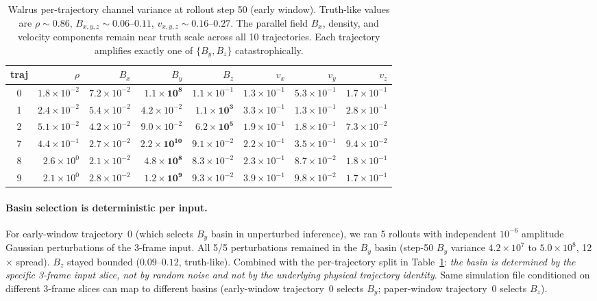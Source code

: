 \documentclass{article}
\begin{document}
\begin{table}[t]
  \centering
  \small
  \caption{Walrus per-trajectory channel variance at rollout step 50 (early window). Truth-like values are $\rho \!\sim\! 0.86$, $B_{x,y,z} \!\sim\! 0.06\text{--}0.11$, $v_{x,y,z} \!\sim\! 0.16\text{--}0.27$. The parallel field $B_x$, density, and velocity components remain near truth scale across all 10 trajectories. Each trajectory amplifies exactly one of $\{B_y, B_z\}$ catastrophically.}
  \label{tab:basin}
  \begin{tabular}{c|rrrrrrr}
    \toprule
    traj & $\rho$ & $B_x$ & $B_y$ & $B_z$ & $v_x$ & $v_y$ & $v_z$ \\
    \midrule
    0 & $1.8 \times 10^{-2}$ & $7.2 \times 10^{-2}$ & $\mathbf{1.1 \times 10^{8}}$ & $1.1 \times 10^{-1}$ & $1.3 \times 10^{-1}$ & $5.3 \times 10^{-1}$ & $1.7 \times 10^{-1}$ \\
    1 & $2.4 \times 10^{-2}$ & $5.4 \times 10^{-2}$ & $4.2 \times 10^{-2}$ & $\mathbf{1.1 \times 10^{3}}$ & $3.3 \times 10^{-1}$ & $1.3 \times 10^{-1}$ & $2.8 \times 10^{-1}$ \\
    2 & $5.1 \times 10^{-2}$ & $4.2 \times 10^{-2}$ & $9.0 \times 10^{-2}$ & $\mathbf{6.2 \times 10^{5}}$ & $1.9 \times 10^{-1}$ & $1.8 \times 10^{-1}$ & $7.3 \times 10^{-2}$ \\
    7 & $4.4 \times 10^{-1}$ & $2.7 \times 10^{-2}$ & $\mathbf{2.2 \times 10^{10}}$ & $9.1 \times 10^{-2}$ & $2.2 \times 10^{-1}$ & $3.5 \times 10^{-1}$ & $9.4 \times 10^{-2}$ \\
    8 & $2.6 \times 10^{0}$ & $2.1 \times 10^{-2}$ & $\mathbf{4.8 \times 10^{8}}$ & $8.3 \times 10^{-2}$ & $2.3 \times 10^{-1}$ & $8.7 \times 10^{-2}$ & $1.8 \times 10^{-1}$ \\
    9 & $2.1 \times 10^{0}$ & $2.8 \times 10^{-2}$ & $\mathbf{1.2 \times 10^{9}}$ & $9.3 \times 10^{-2}$ & $3.9 \times 10^{-1}$ & $9.8 \times 10^{-2}$ & $1.7 \times 10^{-1}$ \\
    \bottomrule
  \end{tabular}
\end{table}

\paragraph{Basin selection is deterministic per input.} For early-window trajectory~0 (which selects $B_y$ basin in unperturbed inference), we ran 5 rollouts with independent $10^{-6}$ amplitude Gaussian perturbations of the 3-frame input. All 5/5 perturbations remained in the $B_y$ basin (step-50 $B_y$ variance $4.2 \times 10^7$ to $5.0 \times 10^8$, 12$\times$ spread). $B_z$ stayed bounded ($0.09\text{--}0.12$, truth-like). Combined with the per-trajectory split in Table~\ref{tab:basin}: \emph{the basin is determined by the specific 3-frame input slice, not by random noise and not by the underlying physical trajectory identity}. Same simulation file conditioned on different 3-frame slices can map to different basins (early-window trajectory~0 selects $B_y$; paper-window trajectory~0 selects $B_z$).
\end{document}

